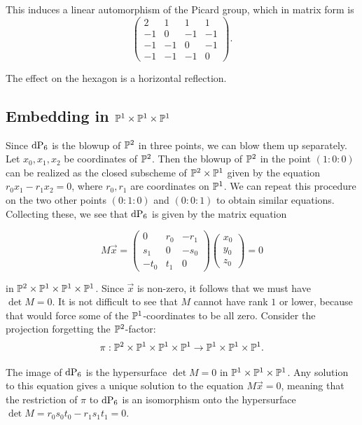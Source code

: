 This induces a linear automorphism of the Picard group, which in matrix form is
\[
\begin{pmatrix}
2 & 1 & 1 & 1 \\
-1& 0 & -1 &-1 \\
-1& -1 & 0 &-1 \\
-1& -1 & -1 &0
\end{pmatrix}.
\]

The effect on the hexagon is a horizontal reflection.

\subsection{Embedding in $\P^1 \times \P^1 \times \P^1$}

Since $\dP6$ is the blowup of $\P^2$ in three points, we can blow them up separately. Let $x_0,x_1,x_2$ be coordinates of $\P^2$. Then the blowup of $\P^2$ in the point $(1:0:0)$ can be realized as the closed subscheme of $\P^2 \times \P^1$ given by the equation $r_0x_1-r_1x_2=0$, where $r_0,r_1$ are coordinates on $\P^1$. We can repeat this procedure on the two other points $(0:1:0)$ and $(0:0:1)$ to obtain similar equations. Collecting these, we see that $\dP6$ is given by the matrix equation

\[
M\vec x = 
\begin{pmatrix}
0 & r_0 & -r_1 \\
s_1 & 0 & -s_0 \\
-t_0 & t_1 & 0
\end{pmatrix}
\begin{pmatrix}
x_0 \\ y_0 \\ z_0
\end{pmatrix}= 0
\]

in $\P^2 \times \P^1 \times \P^1 \times \P^1$. Since $\vec x$ is non-zero, it follows that we must have $\det M = 0$. It is not difficult to see that $M$ cannot have rank $1$ or lower, because that would force some of the $\P^1$-coordinates to be all zero. Consider the projection forgetting the $\P^2$-factor:
$$
\pi:\P^2 \times \P^1 \times \P^1 \times \P^1 \to \P^1 \times \P^1 \times \P^1.
$$

The image of $\dP6$ is the hypersurface $\det M = 0$ in $\P^1 \times \P^1 \times \P^1$. Any solution to this equation gives a unique solution to the equation $M \vec x = 0$, meaning that the restriction of $\pi$ to $\dP6$ is an isomorphism onto the hypersurface $\det M=r_0s_0t_0-r_1s_1t_1=0$. 


